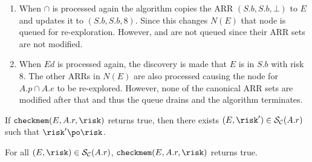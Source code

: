 \begin{enumerate}
\item When  $\cap$  is processed again the algorithm
  copies the ARR $(S.b, S.b, \bot)$ to $E$ and updates it to $(S.b, S.b, 8)$. Since this changes
  $N(E)$ that node is queued for re-exploration. However,  and
   are not queued since their ARR sets are not modified.

\item When $\mathit{Ed}$ is processed again, the discovery is made that $E$ is in $S.b$ with
  risk 8. The other ARRs in $N(E)$ are also processed causing the node for $A.p \cap A.e$ to be
  re-explored. However, none of the canonical ARR sets are modified after that and thus the
  queue drains and the algorithm terminates.
\end{enumerate}

\begin{theorem}
  If $\mbox{\texttt{checkmem}}(E, A.r, \risk)$ returns true, then there exists $(E, \risk') \in
  \mathcal{S}_\mathcal{C}(A.r)$ such that $\risk' \po \risk$.
\end{theorem}

\begin{theorem}
  For all $(E, \risk) \in \mathcal{S}_\mathcal{C}(A.r)$, $\mbox{\texttt{checkmem}}(E, A.r,
  \risk)$ returns true.
\end{theorem}

